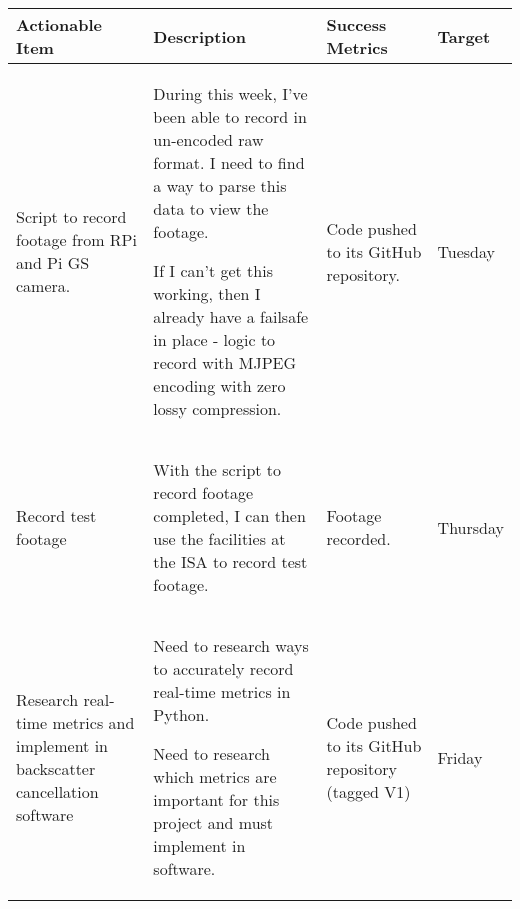 \begin{table}[!h]
    \centering
    \begin{tabularx}{\textwidth}{|X|X|X|l|}
        \hline
        Actionable Item & Description & Success Metrics & Target \\
        \hline
        \hline
        Script to record footage from RPi and Pi GS camera. &
        \begin{myitemize}
            \item During this week, I've been able to record in un-encoded raw format. I need to find a way to parse this data to view the footage.
            \item If I can't get this working, then I already have a failsafe in place - logic to record with MJPEG encoding with zero lossy compression.
        \end{myitemize} &
        \begin{myitemize}
            \item Code pushed to its GitHub repository.
        \end{myitemize} &
        Tuesday \\
        \hline
        Record test footage &
        \begin{myitemize}
            \item With the script to record footage completed, I can then use the facilities at the ISA to record test footage.
        \end{myitemize} &
        \begin{myitemize}
            \item Footage recorded.
        \end{myitemize} &
        Thursday \\
        \hline
        Research real-time metrics and implement in backscatter cancellation software &
        \begin{myitemize}
            \item Need to research ways to accurately record real-time metrics in Python.
            \item Need to research which metrics are important for this project and must implement in software.
        \end{myitemize} &
        \begin{myitemize}
            \item Code pushed to its GitHub repository (tagged V1)
        \end{myitemize} &
        Friday \\
        \hline
    \end{tabularx}
\end{table}
